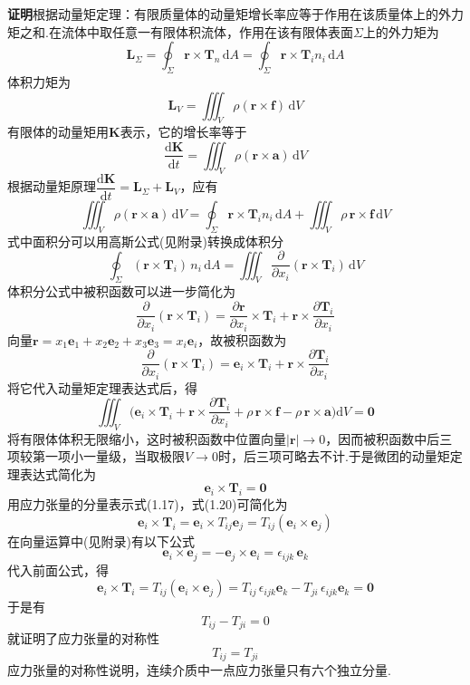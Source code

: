 \noindent\textbf{证明}\quad 根据动量矩定理：有限质量体的动量矩增长率应等于作用在该质量体上的外力矩之和.在流体中取任意一有限体积流体，作用在该有限体表面$\Sigma$上的外力矩为
\[
\boldsymbol{L}_\Sigma=\oint_\Sigma \boldsymbol{r}\times\boldsymbol{T}_n\,\mathrm{d}A=\oint_\Sigma \boldsymbol{r}\times\boldsymbol{T}_i n_i\,\mathrm{d}A
\]
体积力矩为
\[
\boldsymbol{L}_V=\iiint_V \rho(\boldsymbol{r}\times\boldsymbol{f})\,\mathrm{d}V
\]
有限体的动量矩用$\boldsymbol{K}$表示，它的增长率等于
\[
\frac{\mathrm{d}\boldsymbol{K}}{\mathrm{d}t}=\iiint_V \rho(\boldsymbol{r}\times\boldsymbol{a})\,\mathrm{d}V
\]
根据动量矩原理$\dfrac{\mathrm{d}\boldsymbol{K}}{\mathrm{d}t}=\boldsymbol{L}_\Sigma+\boldsymbol{L}_V$，应有
\[
\iiint_V \rho(\boldsymbol{r}\times\boldsymbol{a})\,\mathrm{d}V=\oint_\Sigma \boldsymbol{r}\times\boldsymbol{T}_i n_i\,\mathrm{d}A+\iiint_V \rho\,\boldsymbol{r}\times\boldsymbol{f}\,\mathrm{d}V
\]
式中面积分可以用高斯公式(见附录)转换成体积分
\[
\oint_\Sigma (\boldsymbol{r}\times\boldsymbol{T}_i)\,n_i\,\mathrm{d}A=\iiint_V \frac{\partial}{\partial x_i}(\boldsymbol{r}\times\boldsymbol{T}_i)\,\mathrm{d}V
\]
体积分公式中被积函数可以进一步简化为
\[
\frac{\partial}{\partial x_i}(\boldsymbol{r}\times\boldsymbol{T}_i)=\frac{\partial\boldsymbol{r}}{\partial x_i}\times\boldsymbol{T}_i+\boldsymbol{r}\times\frac{\partial\boldsymbol{T}_i}{\partial x_i}
\]
向量$\boldsymbol{r}=x_1\boldsymbol{e}_1+x_2\boldsymbol{e}_2+x_3\boldsymbol{e}_3=x_i\boldsymbol{e}_i$，故被积函数为
\[
\frac{\partial}{\partial x_i}(\boldsymbol{r}\times\boldsymbol{T}_i)=\boldsymbol{e}_i\times\boldsymbol{T}_i+\boldsymbol{r}\times\frac{\partial\boldsymbol{T}_i}{\partial x_i}
\]
将它代入动量矩定理表达式后，得
\[
\iiint_V\Big(\boldsymbol{e}_i\times\boldsymbol{T}_i+\boldsymbol{r}\times\frac{\partial\boldsymbol{T}_i}{\partial x_i}+\rho\,\boldsymbol{r}\times\boldsymbol{f}-\rho\,\boldsymbol{r}\times\boldsymbol{a}\Big)\mathrm{d}V=\boldsymbol{0}
\]
将有限体体积无限缩小，这时被积函数中位置向量$|\boldsymbol{r}|\to 0$，因而被积函数中后三项较第一项小一量级，当取极限$V\to 0$时，后三项可略去不计.于是微团的动量矩定理表达式简化为
\begin{equation*}
\boldsymbol{e}_i\times\boldsymbol{T}_i=\boldsymbol{0}
\tag{1.20}
\end{equation*}
用应力张量的分量表示式(1.17)，式(1.20)可简化为
\[
\boldsymbol{e}_i\times\boldsymbol{T}_i=\boldsymbol{e}_i\times T_{ij}\boldsymbol{e}_j=T_{ij}(\boldsymbol{e}_i\times\boldsymbol{e}_j)
\]
在向量运算中(见附录)有以下公式
\[
\boldsymbol{e}_i\times\boldsymbol{e}_j=-\boldsymbol{e}_j\times\boldsymbol{e}_i=\epsilon_{ijk}\,\boldsymbol{e}_k
\]
代入前面公式，得
\[
\boldsymbol{e}_i\times\boldsymbol{T}_i=T_{ij}(\boldsymbol{e}_i\times\boldsymbol{e}_j)=T_{ij}\,\epsilon_{ijk}\boldsymbol{e}_k-T_{ji}\,\epsilon_{ijk}\boldsymbol{e}_k=\boldsymbol{0}
\]
于是有
\[
T_{ij}-T_{ji}=0
\]
就证明了应力张量的对称性
\[
T_{ij}=T_{ji}
\]
应力张量的对称性说明，连续介质中一点应力张量只有六个独立分量.

